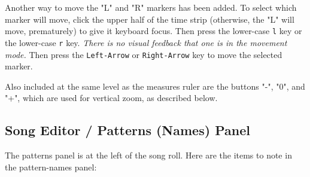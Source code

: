    Another way to move the "L" and "R" markers has been added.
   To select which marker will move, click the upper half of the time
   strip (otherwise, the "L" will move, prematurely) to give it keyboard focus.
   Then press the lower-case
   \texttt{l} key or the lower-case
   \texttt{r} key.
   \textsl{There is no visual feedback that one is in the movement mode.}
   Then press the \texttt{Left-Arrow} or \texttt{Right-Arrow}
   key to move the selected marker.

   Also included at the same level as the measures ruler are the buttons
   "-", "0", and "+", which are used for vertical zoom, as described below.

\subsection{Song Editor / Patterns (Names) Panel}
\label{subsec:song_editor_patterns_panel}

   The patterns panel is at the left of the song roll.
   Here are the items to note in the pattern-names panel:

